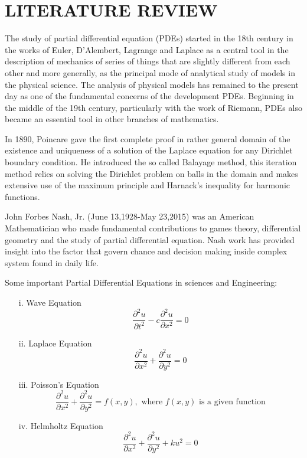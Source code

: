 \documentclass[12pt]{report}
\begin{document}
\section{LITERATURE REVIEW}
\qquad The study of partial differential equation (PDEs) started in the 18th century in the works of Euler, D'Alembert, Lagrange and Laplace as a central tool in the description of mechanics of series of  things that are slightly different from each other and more generally, as the principal mode of analytical study of models in the physical science. The analysis of physical models has remained to the present day as one of the fundamental concerns of the development PDEs. Beginning in the middle of the 19th century, particularly with the work of Riemann, PDEs also became an essential tool in other branches of mathematics. \\
\par In 1890, Poincare gave the first complete proof in rather general domain of the existence and uniqueness of a solution of the Laplace equation for any Dirichlet boundary condition. He introduced the so called Balayage method, this iteration method relies on solving the Dirichlet problem on balls in the domain and makes extensive use of the maximum principle and Harnack's inequality for harmonic functions. \\
\par John Forbes Nash, Jr. (June 13,1928-May 23,2015) was an American Mathematician who made fundamental contributions to games theory, differential geometry and the study of partial differential equation. Nash work has provided insight into the factor that govern chance and decision making inside complex system found in daily life. \\
\par Some important Partial Differential Equations in sciences and Engineering:
\begin{enumerate}
	\item[i.] Wave Equation
  \begin{equation}
  \frac{\partial ^2 u}{\partial t^2}-c \frac{\partial^2u}{\partial x^2}=0
  \end{equation}
  \item[ii.] Laplace Equation
  \begin{equation}
  \frac{\partial^2 u}{\partial x^2}+\frac{\partial^2 u}{\partial y^2}=0
  \end{equation}
  \item[iii.] Poisson's Equation
  \begin{equation}
  \frac{\partial^2 u}{\partial x^2}+\frac{\partial^2 u}{\partial y^2}=f(x,y), \mbox{ where } f(x,y) \mbox{ is a given function}
  \end{equation}
  \item[iv.] Helmholtz Equation
  \begin{equation}
  \frac{\partial^2 u}{\partial x^2}+\frac{\partial^2 u}{\partial y^2}+ku^2=0
  \end{equation}
  \end{enumerate}
\end{document}
